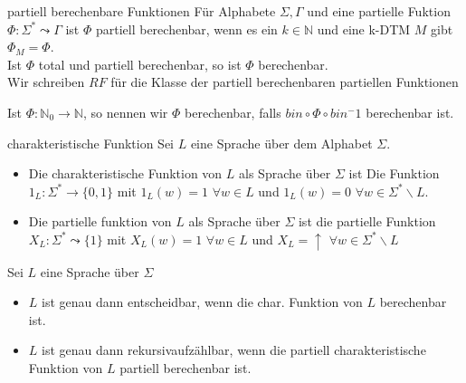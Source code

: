 
\begin{defn}{partiell berechenbare Funktionen}
    Für Alphabete $\Sigma, \Gamma$ und eine partielle Fuktion $\Phi : \Sigma^* \leadsto
    \Gamma$ ist $\Phi$ partiell berechenbar, wenn es ein $k \in \mathbb{N}$ und eine k-DTM $M$ gibt $\Phi_M = \Phi$. \\

    Ist $\Phi$ total und partiell berechenbar, so ist $\Phi$ berechenbar. \\

    Wir schreiben $RF$ für die Klasse der partiell berechenbaren partiellen Funktionen

    Ist $\Phi : \mathbb{N}_0 \rightarrow \mathbb{N}$, so nennen wir $\Phi$ berechenbar,
    falls $bin \circ \Phi \circ bin^-1$ berechenbar ist.
\end{defn}

\begin{defn}{charakteristische Funktion}
    Sei $L$ eine Sprache über dem Alphabet $\Sigma$. \\
    \begin{itemize}
        \item Die charakteristische Funktion von $L$ als Sprache über $\Sigma$ ist Die
              Funktion $1_L : \Sigma^* \rightarrow \{0,1\}$ mit $1_L(w) = 1$ $\forall w \in L$
              und $1_L(w) = 0$ $\forall w \in \Sigma^* \backslash L$.
        \item Die partielle funktion von $L$ als Sprache über $\Sigma$ ist die partielle Funktion
              $X_L : \Sigma^* \leadsto \{1\}$ mit $X_L(w) = 1$ $\forall w \in L$ und $X_L = \uparrow$ $\forall w \in \Sigma^* \backslash L$
    \end{itemize}
\end{defn}

\begin{bem}
    Sei $L$ eine Sprache über $\Sigma$\\
    \begin{itemize}
        \item $L$ ist genau dann entscheidbar, wenn die char. Funktion von $L$ berechenbar ist.
        \item $L$ ist genau dann rekursivaufzählbar, wenn die partiell charakteristische Funktion von $L$
              partiell berechenbar ist.
    \end{itemize}
\end{bem}

